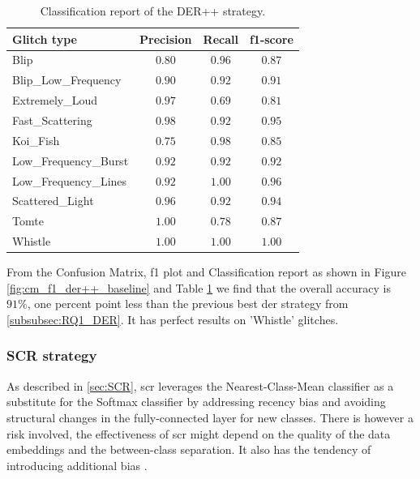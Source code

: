 \begin{table}[ht]
\centering
    \begin{tabular}{|l|c c c|}
    \hline
    \textbf{Glitch type} & \textbf{Precision} & \textbf{Recall} & \textbf{f1-score} \\ \hline
    Blip & $0.80$ & $0.96$ & $0.87$ \\
    Blip\_Low\_Frequency & $0.90$ & $0.92$ & $0.91$\\
    Extremely\_Loud & $0.97$ & $0.69$ &  $0.81$\\
    Fast\_Scattering & $0.98$ & $0.92$ &  $0.95$\\
    Koi\_Fish & $0.75$ & $0.98$ & $0.85$\\
    Low\_Frequency\_Burst & $0.92$ & $0.92$ & $0.92$\\
    Low\_Frequency\_Lines & $0.92$ & $1.00$ & $0.96$\\
    Scattered\_Light & $0.96$ & $0.92$ & $0.94$ \\
    Tomte & $1.00$ & $0.78$ & $0.87$ \\
    Whistle & $1.00$ & $1.00$ & $1.00$ \\
    \hline
    \end{tabular}
    \caption{Classification report of the DER++ strategy.}
    \label{tbl:RQ1_class_report_der++}
\end{table}

From the Confusion Matrix, f1 plot and Classification report as shown in Figure \ref{fig:cm_f1_der++_baseline} and Table \ref{tbl:RQ1_class_report_der++} we find that the overall accuracy is $91\%$, one percent point less than the previous best \acrshort{der} strategy from \ref{subsubsec:RQ1_DER}. It has perfect results on 'Whistle' glitches. \\

\newpage
\subsubsection{SCR strategy}
As described in \ref{sec:SCR}, \acrshort{scr} leverages the Nearest-Class-Mean classifier as a substitute for the Softmax classifier by addressing recency bias and avoiding structural changes in the fully-connected layer for new classes. There is however a risk involved, the effectiveness of \acrshort{scr} might depend on the quality of the data embeddings and the between-class separation. It also has the tendency of introducing additional bias \citep{mai2021supervised, aleixo2023catastrophic}.   



